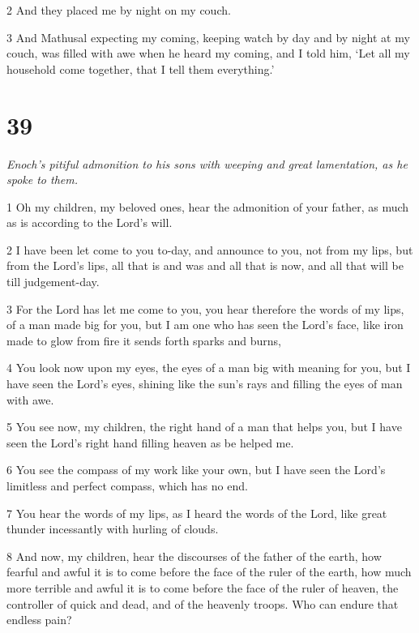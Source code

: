 \par 2 And they placed me by night on my couch.

\par 3 And Mathusal expecting my coming, keeping watch by day and by night at my couch, was filled with awe when he heard my coming, and I told him, ‘Let all my household come together, that I tell them everything.’

\chapter{39}

\par \textit{Enoch's pitiful admonition to his sons with weeping and great lamentation, as he spoke to them.}

\par 1 Oh my children, my beloved ones, hear the admonition of your father, as much as is according to the Lord's will.

\par 2 I have been let come to you to-day, and announce to you, not from my lips, but from the Lord's lips, all that is and was and all that is now, and all that will be till judgement-day.

\par 3 For the Lord has let me come to you, you hear therefore the words of my lips, of a man made big for you, but I am one who has seen the Lord's face, like iron made to glow from fire it sends forth sparks and burns,

\par 4 You look now upon my eyes, the eyes of a man big with meaning for you, but I have seen the Lord's eyes, shining like the sun's rays and filling the eyes of man with awe.

\par 5 You see now, my children, the right hand of a man that helps you, but I have seen the Lord's right hand filling heaven as be helped me.

\par 6 You see the compass of my work like your own, but I have seen the Lord's limitless and perfect compass, which has no end.

\par 7 You hear the words of my lips, as I heard the words of the Lord, like great thunder incessantly with hurling of clouds.

\par 8 And now, my children, hear the discourses of the father of the earth, how fearful and awful it is to come before the face of the ruler of the earth, how much more terrible and awful it is to come before the face of the ruler of heaven, the controller of quick and dead, and of the heavenly troops. Who can endure that endless pain?

